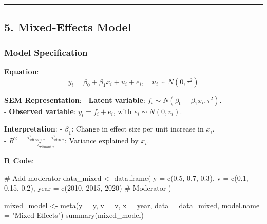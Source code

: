\documentclass[
  letterpaper,
  DIV=11,
  numbers=noendperiod]{scrartcl}
\newenvironment{Shaded}{\begin{snugshade}}{\end{snugshade}}
\newcommand{\AttributeTok}[1]{\textcolor[rgb]{0.40,0.45,0.13}{#1}}
\newcommand{\CommentTok}[1]{\textcolor[rgb]{0.37,0.37,0.37}{#1}}
\newcommand{\DecValTok}[1]{\textcolor[rgb]{0.68,0.00,0.00}{#1}}
\newcommand{\FloatTok}[1]{\textcolor[rgb]{0.68,0.00,0.00}{#1}}
\newcommand{\FunctionTok}[1]{\textcolor[rgb]{0.28,0.35,0.67}{#1}}
\newcommand{\NormalTok}[1]{\textcolor[rgb]{0.00,0.23,0.31}{#1}}
\newcommand{\OtherTok}[1]{\textcolor[rgb]{0.00,0.23,0.31}{#1}}
\newcommand{\SpecialCharTok}[1]{\textcolor[rgb]{0.37,0.37,0.37}{#1}}
\newcommand{\StringTok}[1]{\textcolor[rgb]{0.13,0.47,0.30}{#1}}
\begin{document}
\begin{Shaded}
\end{Shaded}

\begin{center}\rule{0.5\linewidth}{0.5pt}\end{center}

\subsection{\texorpdfstring{5. \textbf{Mixed-Effects
Model}}{5. Mixed-Effects Model}}\label{mixed-effects-model}

\subsubsection{Model Specification}\label{model-specification-2}

\textbf{Equation}: \[
y_i = \beta_0 + \beta_1 x_i + u_i + e_i, \quad u_i \sim N(0, \tau^2)
\]

\textbf{SEM Representation}: - \textbf{Latent variable}:
\(f_i \sim N(\beta_0 + \beta_1 x_i, \tau^2)\).\\
- \textbf{Observed variable}: \(y_i = f_i + e_i\), with
\(e_i \sim N(0, v_i)\).

\textbf{Interpretation}: - \(\beta_1\): Change in effect size per unit
increase in \(x_i\).\\
-
\(R^2 = \frac{\tau^2_{\text{without } x} - \tau^2_{\text{with } x}}{\tau^2_{\text{without } x}}\):
Variance explained by \(x_i\).

\textbf{R Code}:

\begin{Shaded}
\begin{Highlighting}[]
\CommentTok{\# Add moderator}
\NormalTok{data\_mixed }\OtherTok{\textless{}{-}} \FunctionTok{data.frame}\NormalTok{(}
  \AttributeTok{y =} \FunctionTok{c}\NormalTok{(}\FloatTok{0.5}\NormalTok{, }\FloatTok{0.7}\NormalTok{, }\FloatTok{0.3}\NormalTok{),}
  \AttributeTok{v =} \FunctionTok{c}\NormalTok{(}\FloatTok{0.1}\NormalTok{, }\FloatTok{0.15}\NormalTok{, }\FloatTok{0.2}\NormalTok{),}
  \AttributeTok{year =} \FunctionTok{c}\NormalTok{(}\DecValTok{2010}\NormalTok{, }\DecValTok{2015}\NormalTok{, }\DecValTok{2020}\NormalTok{)  }\CommentTok{\# Moderator}
\NormalTok{)}

\NormalTok{mixed\_model }\OtherTok{\textless{}{-}} \FunctionTok{meta}\NormalTok{(}\AttributeTok{y =}\NormalTok{ y, }\AttributeTok{v =}\NormalTok{ v, }\AttributeTok{x =}\NormalTok{ year, }\AttributeTok{data =}\NormalTok{ data\_mixed, }\AttributeTok{model.name =} \StringTok{"Mixed Effects"}\NormalTok{)}
\FunctionTok{summary}\NormalTok{(mixed\_model)}
\end{Highlighting}
\end{Shaded}
\end{document}
